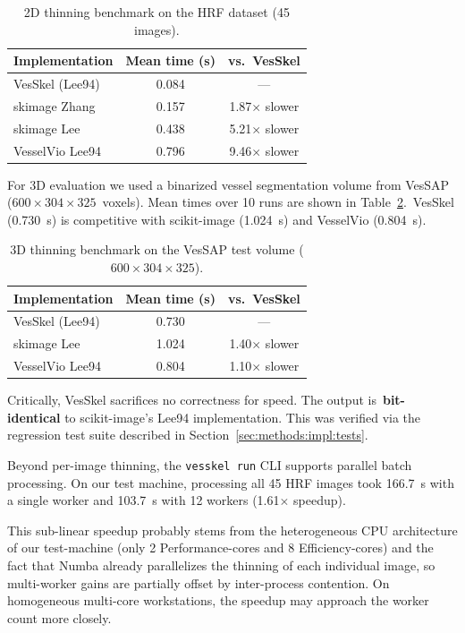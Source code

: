\documentclass[11pt]{article}
\begin{document}
\begin{table}[htb]
  \centering
  \caption{2D thinning benchmark on the HRF dataset (45 images).}
  \label{tab:perf-2d}
  \small
  \begin{tabularx}{0.7\linewidth}{lcc}
    \toprule
    Implementation & Mean time (s) & vs.\ VesSkel \\
    \midrule
    VesSkel (Lee94)     & 0.084 & ---   \\
    skimage Zhang       & 0.157 & 1.87$\times$ slower \\
    skimage Lee         & 0.438 & 5.21$\times$ slower \\
    VesselVio Lee94     & 0.796 & 9.46$\times$ slower \\
    \bottomrule
  \end{tabularx}
\end{table}

For 3D evaluation we used a binarized vessel segmentation volume from
VesSAP~\cite{VesSAP} ($600\times304\times325$~voxels). Mean times
over 10 runs are shown in Table~\ref{tab:perf-3d}.~VesSkel (0.730~s)
is competitive with scikit-image (1.024~s) and VesselVio (0.804~s).

\begin{table}[htb]
  \centering
  \caption{3D thinning benchmark on the VesSAP test volume
  ($600\times304\times325$).}
  \label{tab:perf-3d}
  \small
  \begin{tabularx}{0.7\linewidth}{lcc}
    \toprule
    Implementation & Mean time (s) & vs.\ VesSkel \\
    \midrule
    VesSkel (Lee94)   & 0.730 & ---   \\
    skimage Lee       & 1.024 & 1.40$\times$ slower \\
    VesselVio Lee94   & 0.804 & 1.10$\times$ slower \\
    \bottomrule
  \end{tabularx}
\end{table}

Critically, VesSkel sacrifices no correctness for speed. The output
is~\textbf{bit-identical} to scikit-image's Lee94 implementation.
This was verified via the regression test suite described in
Section~\ref{sec:methods:impl:tests}.

Beyond per-image thinning, the \texttt{vesskel run} CLI supports
parallel batch processing. On our test machine, processing all 45
HRF images took 166.7~s with a single worker and 103.7~s with 12
workers (1.61$\times$ speedup).

This sub-linear speedup probably stems from the heterogeneous CPU
architecture of our test-machine (only 2 Performance-cores and 8
Efficiency-cores) and the fact that Numba already parallelizes the
thinning of each individual image, so multi-worker gains are
partially offset by inter-process contention. On homogeneous
multi-core workstations, the speedup may approach the worker count more closely.
\end{document}
